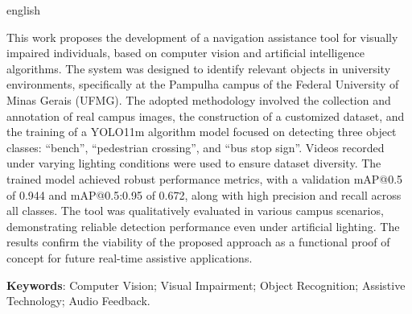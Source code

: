 \documentclass[
	12pt,				%
	openright,			%
	oneside,			%
	a4paper,			%
	english,			%
	french,				%
	spanish,			%
	brazil,				%
	]{abntex2}
\begin{document}
 \begin{resumo}[ABSTRACT]
  \begin{otherlanguage*}{english}

 \vspace{\onelineskip}
 
This work proposes the development of a navigation assistance tool for visually impaired individuals, based on computer vision and artificial intelligence algorithms. The system was designed to identify relevant objects in university environments, specifically at the Pampulha campus of the Federal University of Minas Gerais (UFMG). The adopted methodology involved the collection and annotation of real campus images, the construction of a customized dataset, and the training of a YOLO11m algorithm model focused on detecting three object classes: “bench”, “pedestrian crossing”, and “bus stop sign”. Videos recorded under varying lighting conditions were used to ensure dataset diversity. The trained model achieved robust performance metrics, with a validation mAP@0.5 of 0.944 and mAP@0.5:0.95 of 0.672, along with high precision and recall across all classes. The tool was qualitatively evaluated in various campus scenarios, demonstrating reliable detection performance even under artificial lighting. The results confirm the viability of the proposed approach as a functional proof of concept for future real-time assistive applications.
 \vspace{\onelineskip}
    
 \noindent
    \textbf{Keywords}: Computer Vision; Visual Impairment; Object Recognition; Assistive Technology; Audio Feedback.
 \end{otherlanguage*}
 \end{resumo}

 \listoffigures*
 \cleardoublepage

 \listoftables*
 \cleardoublepage

\end{document}
